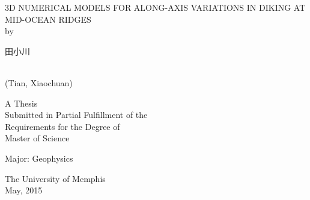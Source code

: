 
\thispagestyle{empty}  %


\begin{center}


\uppercase{3D Numerical Models for Along-axis Variations in Diking at Mid-Ocean Ridges}
\\
\vspace{10pt}
by
\vspace{10pt}
\\
\begin{CJK}{UTF8}{gbsn}
田小川
\end{CJK}
\\
(Tian, Xiaochuan)
\vspace{100pt}

A Thesis
\\
Submitted in Partial Fulfillment of the 
\\
Requirements for the Degree of 
\\
Master of Science
\\
\vspace{35pt}

Major: Geophysics
\\

\vspace{120pt}

The University of Memphis
\\

May, 2015

\end{center}

\restoregeometry
